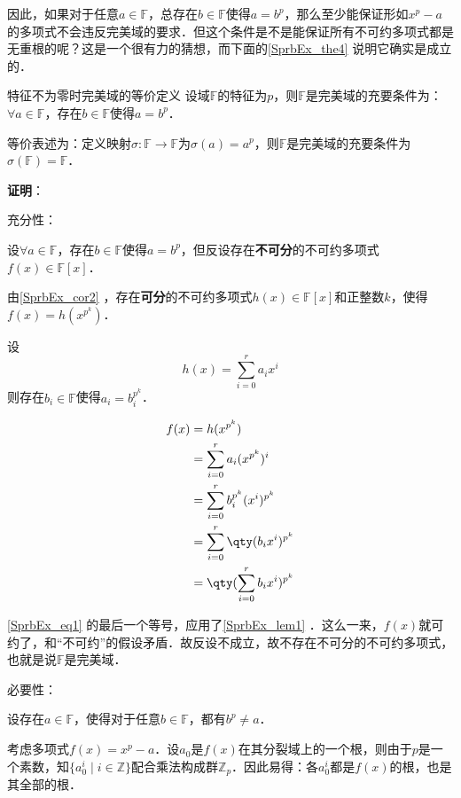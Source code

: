 因此，如果对于任意$a\in\mathbb{F}$，总存在$b\in\mathbb{F}$使得$a=b^p$，那么至少能保证形如$x^p-a$的多项式不会违反完美域的要求．但这个条件是不是能保证所有不可约多项式都是无重根的呢？这是一个很有力的猜想，而下面的\autoref{SprbEx_the4} 说明它确实是成立的．





\begin{theorem}{特征不为零时完美域的等价定义}\label{SprbEx_the4}
设域$\mathbb{F}$的特征为$p$，则$\mathbb{F}$是完美域的充要条件为：$\forall a\in\mathbb{F}$，存在$b\in\mathbb{F}$使得$a=b^p$．

等价表述为：定义映射$\sigma:\mathbb{F}\to\mathbb{F}$为$\sigma(a)=a^p$，则$\mathbb{F}$是完美域的充要条件为$\sigma(\mathbb{F})=\mathbb{F}$．
\end{theorem}

\textbf{证明}：

充分性：

设$\forall a\in\mathbb{F}$，存在$b\in\mathbb{F}$使得$a=b^p$，但反设存在\textbf{不可分}的不可约多项式$f(x)\in\mathbb{F}[x]$．

由\autoref{SprbEx_cor2} ，存在\textbf{可分}的不可约多项式$h(x)\in\mathbb{F}[x]$和正整数$k$，使得$f(x)=h(x^{p^k})$．

设
\begin{equation}
h(x) = \sum_{i=0}^r a_ix^i
\end{equation}
则存在$b_i\in\mathbb{F}$使得$a_i=b_i^{p^k}$．

\begin{equation}\label{SprbEx_eq1}
\begin{aligned}
f(x)&=h(x^{p^k}) \\
&=\sum_{i=0}^r a_i(x^{p^k})^i\\
&=\sum_{i=0}^r b_i^{p^k}(x^{i})^{p^k}\\
&=\sum_{i=0}^r \qty(b_ix^i)^{p^k}\\
&=\qty(\sum_{i=0}^r b_ix^i)^{p^k}
\end{aligned}
\end{equation}

\autoref{SprbEx_eq1} 的最后一个等号，应用了\autoref{SprbEx_lem1} ．这么一来，$f(x)$就可约了，和“不可约”的假设矛盾．故反设不成立，故不存在不可分的不可约多项式，也就是说$\mathbb{F}$是完美域．

必要性：

设存在$a\in\mathbb{F}$，使得对于任意$b\in\mathbb{F}$，都有$b^p\neq a$．

考虑多项式$f(x) = x^p-a$．设$a_0$是$f(x)$在其分裂域上的一个根，则由于$p$是一个素数，知$\{a_0^i\mid i\in\mathbb{Z}\}$配合乘法构成群$\mathbb{Z}_p$．因此易得：各$a_0^i$都是$f(x)$的根，也是其全部的根．

